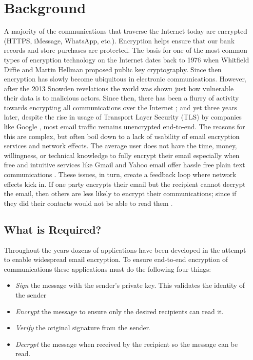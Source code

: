 \documentclass{sig-alternate-05-2015}
\begin{document}
\section{Background}
\par A majority of the communications that traverse the Internet today are encrypted (HTTPS, iMessage, WhatsApp, etc.). Encryption helps ensure that our bank records and store purchases are protected. The basis for one of the most common types of encryption technology on the Internet dates back to 1976 when Whitfield Diffie and Martin Hellman proposed public key cryptography. Since then encryption has slowly become ubiquitous in electronic communications. However, after the 2013 Snowden revelations the world was shown just how vulnerable their data is to malicious actors. Since then, there has been a flurry of activity towards encrypting all communications over the Internet \cite{wired-encrypted-traffic}; and yet three years later, despite the rise in usage of Transport Layer Security (TLS) by companies like Google \cite{gmail-tls-report}, most email traffic remains unencrypted end-to-end. The reasons for this are complex, but often boil down to a lack of usability of email encryption services and network effects. The average user does not have the time, money, willingness, or technical knowledge to fully encrypt their email especially when free and intuitive services like Gmail and Yahoo email offer hassle free plain text communications \cite{garfinkel2005make}. These issues, in turn, create a feedback loop where network effects kick in. If one party encrypts their email but the recipient cannot decrypt the email, then  others are less likely to encrypt their communications; since if they did their contacts would not be able to read them \cite{dingledine2006anonymity}.

\subsection{What is Required?}
Throughout the years dozens of applications have been developed in the attempt to enable widespread email encryption. To ensure end-to-end encryption of communications these applications must do the following four things:

\begin{itemize}
  \item \textit{Sign} the message with the sender's private key. This validates the identity of the sender
  \item \textit{Encrypt} the message to ensure only the desired recipients can read it.
  \item \textit{Verify} the original signature from the sender.
  \item \textit{Decrypt} the message when received by the recipient so the message can be read.
\end{itemize}
\end{document}
